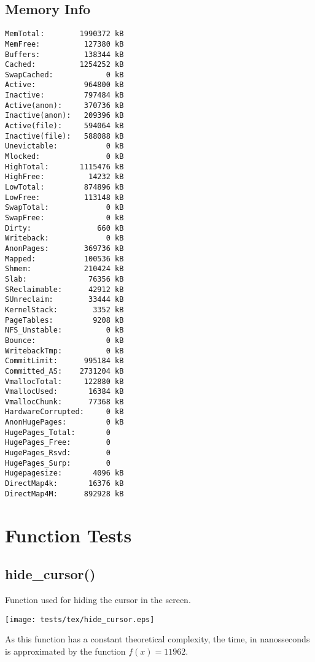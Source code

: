 \documentclass{article}
\begin{document}
\subsection{Memory Info}
\begin{verbatim}
MemTotal:        1990372 kB
MemFree:          127380 kB
Buffers:          138344 kB
Cached:          1254252 kB
SwapCached:            0 kB
Active:           964800 kB
Inactive:         797484 kB
Active(anon):     370736 kB
Inactive(anon):   209396 kB
Active(file):     594064 kB
Inactive(file):   588088 kB
Unevictable:           0 kB
Mlocked:               0 kB
HighTotal:       1115476 kB
HighFree:          14232 kB
LowTotal:         874896 kB
LowFree:          113148 kB
SwapTotal:             0 kB
SwapFree:              0 kB
Dirty:               660 kB
Writeback:             0 kB
AnonPages:        369736 kB
Mapped:           100536 kB
Shmem:            210424 kB
Slab:              76356 kB
SReclaimable:      42912 kB
SUnreclaim:        33444 kB
KernelStack:        3352 kB
PageTables:         9208 kB
NFS_Unstable:          0 kB
Bounce:                0 kB
WritebackTmp:          0 kB
CommitLimit:      995184 kB
Committed_AS:    2731204 kB
VmallocTotal:     122880 kB
VmallocUsed:       16384 kB
VmallocChunk:      77368 kB
HardwareCorrupted:     0 kB
AnonHugePages:         0 kB
HugePages_Total:       0
HugePages_Free:        0
HugePages_Rsvd:        0
HugePages_Surp:        0
Hugepagesize:       4096 kB
DirectMap4k:       16376 kB
DirectMap4M:      892928 kB
\end{verbatim}
\section{Function Tests}
\subsection{hide\_cursor()}
Function used for hiding the cursor in the screen.


\texttt{[image: tests/tex/hide\_cursor.eps]}

As this function has a constant theoretical
complexity, the time, in nanosseconds is 
approximated by the function $f(x)=11962$.
\end{document}
